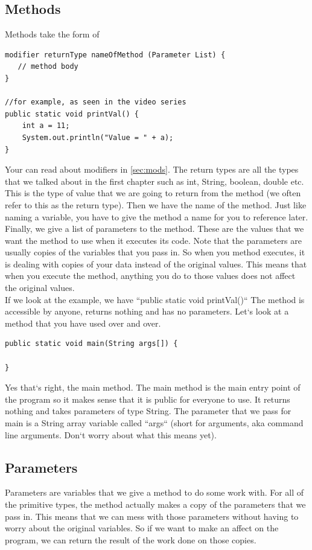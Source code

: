 \documentclass[11]{article}
\begin{document}
\subsection{Methods}
Methods take the form of
\begin{lstlisting}
modifier returnType nameOfMethod (Parameter List) {
   // method body
}

//for example, as seen in the video series
public static void printVal() {
    int a = 11;
    System.out.println("Value = " + a);
}

\end{lstlisting}

Your can read about modifiers in \autoref{sec:mods}. The return types are all the types that we talked about in the first chapter such as int, String, boolean, double etc. This is the type of value that we are going to return from the method (we often refer to this as the return type). Then we have the name of the method. Just like naming a variable, you have to give the method a name for you to reference later. Finally, we give a list of parameters to the method. These are the values that we want the method to use when it executes its code. Note that the parameters are usually copies of the variables that you pass in. So when you method executes, it is dealing with copies of your data instead of the original values. This means that when you execute the method, anything you do to those values does not affect the original values.\\

If we look at the example, we have ``public static void printVal()`` The method is accessible by anyone, returns nothing and has no parameters. Let`s look at a method that you have used over and over.

\begin{lstlisting}
public static void main(String args[]) {

}
\end{lstlisting}
Yes that`s right, the main method. The main method is the main entry point of the program so it makes sense that it is public for everyone to use. It returns nothing and takes parameters of type String. The parameter that we pass for main is a String array variable called ``args`` (short for arguments, aka command line arguments. Don`t worry about what this means yet).

\subsection{Parameters}
Parameters are variables that we give a method to do some work with. For all of the primitive types, the method actually makes a copy of the parameters that we pass in. This means that we can mess with those parameters without having to worry about the original variables. So if we want to make an affect on the program, we can return the result of the work done on those copies.\\
\end{document}

